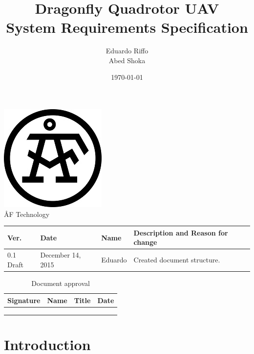 \documentclass[a4paper]{article}
\title{Dragonfly Quadrotor UAV \\ System Requirements Specification}
\author{Eduardo Riffo \\ Abed Shoka}
\date{\today}
\begin{document}

\maketitle                      	%

\begin{center}
\vspace{64pt}
\includegraphics[scale=1.6]{images/AF_Logotype20141_Black.png}
\vspace{16pt}
\\ \large ÅF Technology
\end{center}

\vspace{16pt}
\begin{tabular}{ l l l p{8.5cm} }
	Ver. & Date & Name & Description and Reason for change \\\hline
	0.1 Draft & December 14, 2015 & Eduardo & Created document structure.\\
\end{tabular}

\begin{table}[]
\centering
\caption{Document approval}
\begin{tabular}{c c c c}
\hline\hline
Signature & Name & Title & Date \\ [0.5ex]
\hline
	& & & \\
	& & & \\
	& & & \\
\hline
\end{tabular}
\label{table:nonline}
\end{table}

\newpage

\tableofcontents				%

\newpage

\section{Introduction}
\end{document}
